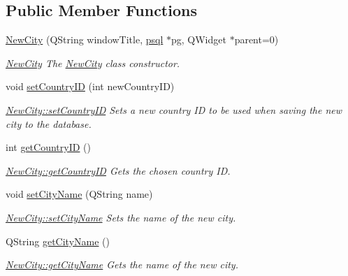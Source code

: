 \subsection*{Public Member Functions}
\begin{DoxyCompactItemize}
\item 
\mbox{\hyperlink{class_new_city_a8b626e1fe480368bc7c2f819c1de6a19}{New\+City}} (Q\+String window\+Title, \mbox{\hyperlink{classpsql}{psql}} $\ast$pg, Q\+Widget $\ast$parent=0)
\begin{DoxyCompactList}\small\item\em \mbox{\hyperlink{class_new_city}{New\+City}} The \mbox{\hyperlink{class_new_city}{New\+City}} class constructor. \end{DoxyCompactList}\item 
void \mbox{\hyperlink{class_new_city_a8a96f2c58640c96faf74e1f3bb956e4e}{set\+Country\+ID}} (int new\+Country\+ID)
\begin{DoxyCompactList}\small\item\em \mbox{\hyperlink{class_new_city_a8a96f2c58640c96faf74e1f3bb956e4e}{New\+City\+::set\+Country\+ID}} Sets a new country ID to be used when saving the new city to the database. \end{DoxyCompactList}\item 
int \mbox{\hyperlink{class_new_city_a743baefdc6604f1bf8da124056939b0c}{get\+Country\+ID}} ()
\begin{DoxyCompactList}\small\item\em \mbox{\hyperlink{class_new_city_a743baefdc6604f1bf8da124056939b0c}{New\+City\+::get\+Country\+ID}} Gets the chosen country ID. \end{DoxyCompactList}\item 
void \mbox{\hyperlink{class_new_city_afe093fcb1aa6623e896c52ea35ff0481}{set\+City\+Name}} (Q\+String name)
\begin{DoxyCompactList}\small\item\em \mbox{\hyperlink{class_new_city_afe093fcb1aa6623e896c52ea35ff0481}{New\+City\+::set\+City\+Name}} Sets the name of the new city. \end{DoxyCompactList}\item 
Q\+String \mbox{\hyperlink{class_new_city_a3be62538974fa100134d694546608877}{get\+City\+Name}} ()
\begin{DoxyCompactList}\small\item\em \mbox{\hyperlink{class_new_city_a3be62538974fa100134d694546608877}{New\+City\+::get\+City\+Name}} Gets the name of the new city. \end{DoxyCompactList}\end{DoxyCompactItemize}


